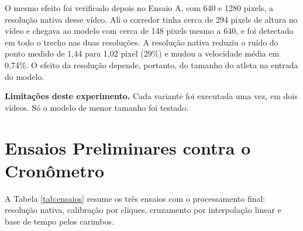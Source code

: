 \documentclass[
    12pt,               %
    openright,          %
    twoside,            %
    a4paper,            %
    chapter=TITLE,      %
    english,            %
    brazil              %
    ]{abntex2}
\begin{document}
O mesmo efeito foi verificado depois no Ensaio A, com 640 e 1280 pixels, a resolução nativa desse vídeo. Ali o corredor tinha cerca de 294 pixels de altura no vídeo e chegava ao modelo com cerca de 148 pixels mesmo a 640, e foi detectado em todo o trecho nas duas resoluções. A resolução nativa reduziu o ruído do ponto medido de 1,44 para 1,02 pixel (29\%) e mudou a velocidade média em 0,74\%. O efeito da resolução depende, portanto, do tamanho do atleta na entrada do modelo.

\textbf{Limitações deste experimento.} Cada variante foi executada uma vez, em dois vídeos. Só o modelo de menor tamanho foi testado.

\section{Ensaios Preliminares contra o Cronômetro}
\label{sec:resultado_ensaios}

A Tabela \ref{tab:ensaios} resume os três ensaios com o processamento final: resolução nativa, calibração por cliques, cruzamento por interpolação linear e base de tempo pelos carimbos.
\end{document}
